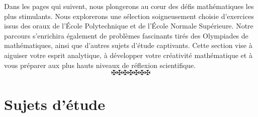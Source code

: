 \documentclass[a4paper,11pt]{article}
\newcounter{exercice}
\begin{document}
Dans les pages qui suivent, nous plongerons au c{\oe}ur des d{\'e}fis
math{\'e}matiques les plus stimulants. Nous explorerons une s{\'e}lection
soigneusement choisie d'exercices issus des oraux de l'{\'E}cole Polytechnique
et de l'{\'E}cole Normale Sup{\'e}rieure. Notre parcours s'enrichira
{\'e}galement de probl{\`e}mes fascinants tir{\'e}s des Olympiades de
math{\'e}matiques, ainsi que d'autres sujets d'{\'e}tude captivants. Cette
section vise {\`a} aiguiser votre esprit analytique, {\`a} d{\'e}velopper
votre cr{\'e}ativit{\'e} math{\'e}matique et {\`a} vous pr{\'e}parer aux plus
hauts niveaux de r{\'e}flexion scientifique.
\[ \maltese \maltese \maltese \maltese \maltese \maltese \maltese \]

\newpage






































\newpage
\part{Sujets d'{\'e}tude}

\
\end{document}
